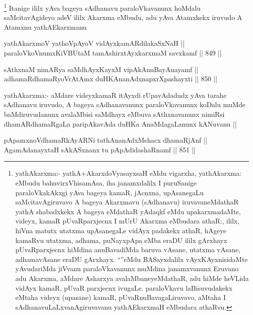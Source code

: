 \begin{artha}
\footnote{yathA\s karxma:- yathA+AkarxdoVyasayxsaH eMdu vigarxha, yathAkarxma: eMbudu bahuvirxVhisamAsa, iha janamxdalilx I puruSanige paraloVkakAkxgi yAva bageya kamaR, jAcnxna, upAsanegaLu saMcitavAgiruvavo A bageya Akarxmavu (sAdhanavu) iruvavaneMdathaR yathA shabadxkekx A bageya eMdathaR yAdaqkf eMdu upakarxmadaMte, videyx, kamaR pUvaRparxjecnx I mUrU Akarxma eMbudara athaR:, ililx, hiVna matutx utatxma upAsanegaLe vidAyx padakekx athaR, hAgeye kamaRvu utatxma, adhama, puNayxpApa eMba eraDU ililx gArxhayx pUvaRparxjecnx hiMdina anuBavadiMda baruva vAsane, utatxma vAsane, adhamavAsane eraDU gArxhayx. ``\stext''eMdu BASayxdalilx vAyxKAyxnisidaMte yAvudariMda jiVvanu paraloVkavanunx muMdina janamxvanunx Eruvano adu Akarxma, aMdare Asharxya avalaMbaneyeMdathaR, adu hiMde heVLida vidAyx kamaR, pUvaR parxjecnx ivugaLe. paraloVkavu laBisuvudakekx eMtaha videyx (upasane) kamaR, pUvaRnuBavagaLiruvavo, aMtaha I sAdhanavuLaLxvanAgiruvavanu yathAE\s karxmaH eMbudara athaRvu.}
Itanige ililx yAva bageya sAdhanavu paraloVkavanunx hoMdalu saMcitavAgideyo adeV ililx Akarxma eMbudu, adu yAva Atamxkekx iruvudo A Atamxnu yathAE\s karxmanu
\end{artha}

\begin{shl}
yathAkarxmoV yathoVpAyoV vidAyxkamARdilakaSxNaH || \\
paraloVkoVnumxKiVBUtaM tamAshirxtAyx\s \s karxmaM savxkamf ||  849 ||  
\end{shl}
				
\begin{shl}
sAthxnaM nimARya saMdhAyxKayxM vipAkAnuBayAnayamf || \\
adhamaRdhamaRyoVrAtAmx duHKAnanAdxnapxrXpashayxti ||  850 ||  
\end{shl}

\begin{artha}
yathAkarxma:- aMdare videyxkamaR itAyxdi rUpavAdadudx yAva tarahe sAdhanavu iruvudo, A bageya sAdhanavanunx paraloVkavanunx koDalu muMde baMdiruvudanunx avalaMbisi saMdhayx eMbuva sAthxnavanunx nimiRsi dhamARdhamaRgaLa paripAkavAda duHKa AnaMdagaLanunx kANuvanu ||
\end{artha}


\begin{shl}
pApamxnoV\s dhamaRkAyARNi tathA\s \s nanAdxMshacx dhamaRjAnf || \\
AgamAdanayxtaH sAkASxnanx tu pApAdidashaRnamf ||  851 ||  
\end{shl}

